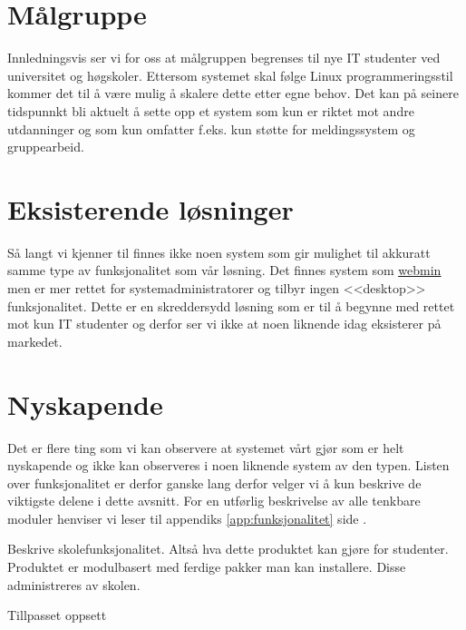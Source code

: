 \section{Målgruppe} \label{sec:målgruppe}
Innledningsvis ser vi for oss at målgruppen begrenses til nye IT studenter ved universitet og høgskoler. Ettersom systemet skal følge Linux programmeringsstil\cite{book:unixprog} kommer det til å være mulig å skalere dette etter egne behov. Det kan på seinere tidspunnkt bli aktuelt å sette opp et system som kun er riktet mot andre utdanninger og som kun omfatter f.eks. kun støtte for meldingssystem og gruppearbeid.

\section{Eksisterende løsninger}
Så langt vi kjenner til finnes ikke noen system som gir mulighet til akkuratt samme type av funksjonalitet som vår løsning. Det finnes system som \href{http://en.wikipedia.org/wiki/Webmin}{\underline{webmin}} men er mer rettet for systemadministratorer og tilbyr ingen <<desktop>> funksjonalitet. Dette er en skreddersydd løsning som er til å begynne med rettet mot kun IT studenter og derfor ser vi ikke at noen liknende idag eksisterer på markedet. 

\section{Nyskapende}
Det er flere ting som vi kan observere at systemet vårt gjør som er helt nyskapende og ikke kan observeres i noen liknende system av den typen. Listen over funksjonalitet er derfor ganske lang derfor velger vi å kun beskrive de viktigste delene i dette avsnitt. For en utførlig beskrivelse av alle tenkbare moduler henviser vi leser til appendiks \ref{app:funksjonalitet} side \pageref{app:funksjonalitet}.

Beskrive skolefunksjonalitet. Altså hva dette produktet kan gjøre for studenter.\\
Produktet er modulbasert med ferdige pakker man kan installere. Disse administreres av skolen.\\
\begin{description}
\item[Tillpasset oppsett]
\end{description}